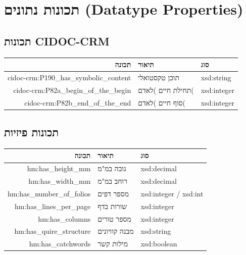 \newpage

\section{תכונות נתונים (Datatype Properties)}

\subsection{תכונות CIDOC-CRM}

\begin{longtable}{|r|p{5cm}|p{3cm}|}
\hline
\textbf{תכונה} & \textbf{תיאור} & \textbf{סוג} \\
\hline
\endhead

cidoc-crm:P190\_has\_symbolic\_content & תוכן טקסטואלי & xsd:string\\
\hline
cidoc-crm:P82a\_begin\_of\_the\_begin & תחילת חיים )לאדם( & xsd:integer\\
\hline
cidoc-crm:P82b\_end\_of\_the\_end & סוף חיים )לאדם( & xsd:integer\\
\hline
\end{longtable}

\subsection{תכונות פיזיות}

\begin{longtable}{|r|p{5cm}|p{3cm}|}
\hline
\textbf{תכונה} & \textbf{תיאור} & \textbf{סוג} \\
\hline
\endhead

hm:has\_height\_mm & גובה במ"מ & xsd:decimal\\
\hline
hm:has\_width\_mm & רוחב במ"מ & xsd:decimal\\
\hline
hm:has\_number\_of\_folios & מספר דפים & xsd:integer / xsd:int\\
\hline
hm:has\_lines\_per\_page & שורות בדף & xsd:integer\\
\hline
hm:has\_columns & מספר טורים & xsd:integer\\
\hline
hm:has\_quire\_structure & מבנה קוויונים & xsd:string\\
\hline
hm:has\_catchwords & מילות קשר & xsd:boolean\\
\hline
\end{longtable}

